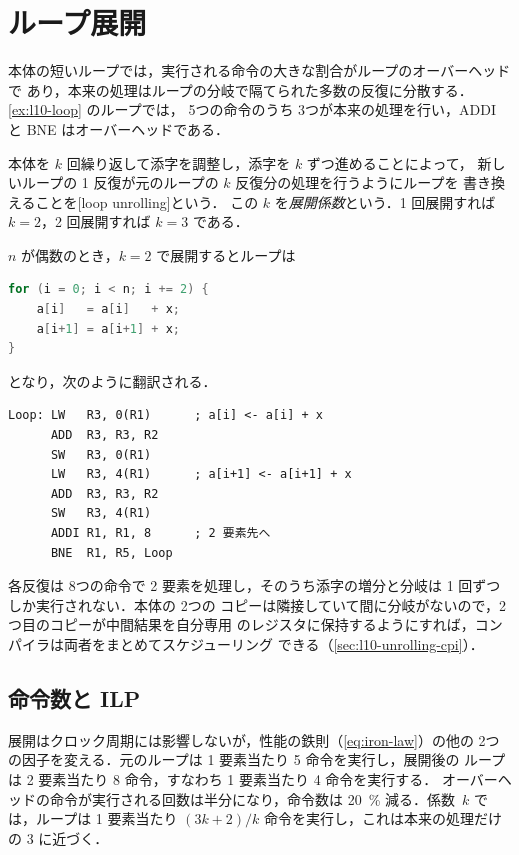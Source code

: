 \documentclass[../main.tex]{subfiles}
\begin{document}
\section{ループ展開}
\label{sec:l10-unrolling}

本体の短いループでは，実行される命令の大きな割合がループのオーバーヘッドで
あり，本来の処理はループの分岐で隔てられた多数の反復に分散する．
\cref{ex:l10-loop} のループでは，
5つの命令のうち 3つが本来の処理を行い，ADDI と BNE はオーバーヘッドである．

\begin{definition}[ループ展開]
  \label{def:l10-unrolling}
  本体を $k$ 回繰り返して添字を調整し，添字を $k$ ずつ進めることによって，
  新しいループの 1 反復が元のループの $k$ 反復分の処理を行うようにループを
  書き換えることを[loop unrolling]という．
  この $k$ を\emph{展開係数}という．1 回展開すれば $k=2$，2 回展開すれば
  $k=3$ である．
\end{definition}

$n$ が偶数のとき，$k=2$ で展開するとループは
\begin{lstlisting}[language=C, numbers=none]
for (i = 0; i < n; i += 2) {
    a[i]   = a[i]   + x;
    a[i+1] = a[i+1] + x;
}
\end{lstlisting}
となり，次のように翻訳される．
\begin{lstlisting}[language={[x86masm]Assembler}, numbers=none]
Loop: LW   R3, 0(R1)      ; a[i] <- a[i] + x
      ADD  R3, R3, R2
      SW   R3, 0(R1)
      LW   R3, 4(R1)      ; a[i+1] <- a[i+1] + x
      ADD  R3, R3, R2
      SW   R3, 4(R1)
      ADDI R1, R1, 8      ; 2 要素先へ
      BNE  R1, R5, Loop
\end{lstlisting}
各反復は 8つの命令で 2 要素を処理し，そのうち添字の増分と分岐は 1 回ずつ
しか実行されない．本体の 2つの
コピーは隣接していて間に分岐がないので，2つ目のコピーが中間結果を自分専用
のレジスタに保持するようにすれば，コンパイラは両者をまとめてスケジューリング
できる（\cref{sec:l10-unrolling-cpi}）．

\subsection{命令数と ILP}
\label{sec:l10-unrolling-ilp}

展開はクロック周期には影響しないが，性能の鉄則（\cref{eq:iron-law}）の他の
2つの因子を変える．元のループは 1 要素当たり 5 命令を実行し，展開後の
ループは 2 要素当たり 8 命令，すなわち 1 要素当たり 4 命令を実行する．
オーバーヘッドの命令が実行される回数は半分になり，命令数は
\SI{20}{\percent} 減る．係数~$k$ では，ループは 1 要素当たり $(3k+2)/k$
命令を実行し，これは本来の処理だけの 3 に近づく．
\end{document}
